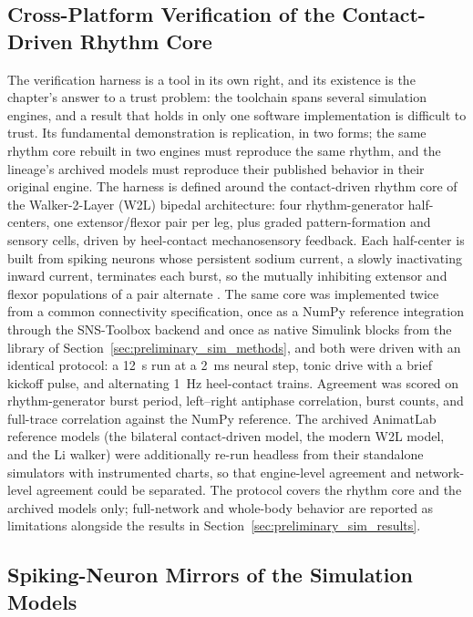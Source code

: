 \subsection{Cross-Platform Verification of the Contact-Driven Rhythm Core}\label{sec:crossengine_methods}

The verification harness is a tool in its own right, and its existence is the chapter's answer to a trust problem: the toolchain spans several simulation engines, and a result that holds in only one software implementation is difficult to trust. Its fundamental demonstration is replication, in two forms; the same rhythm core rebuilt in two engines must reproduce the same rhythm, and the lineage's archived models must reproduce their published behavior in their original engine. The harness is defined around the contact-driven rhythm core of the Walker-2-Layer (W2L) bipedal architecture: four rhythm-generator half-centers, one extensor/flexor pair per leg, plus graded pattern-formation and sensory cells, driven by heel-contact mechanosensory feedback. Each half-center is built from spiking neurons whose persistent sodium current, a slowly inactivating inward current, terminates each burst, so the mutually inhibiting extensor and flexor populations of a pair alternate \citep{deng_neuromechanical_2019}. The same core was implemented twice from a common connectivity specification, once as a NumPy reference integration through the SNS-Toolbox backend and once as native Simulink blocks from the library of Section~\ref{sec:preliminary_sim_methods}, and both were driven with an identical protocol: a \qty{12}{\second} run at a \qty{2}{\milli\second} neural step, tonic drive with a brief kickoff pulse, and alternating \qty{1}{\Hz} heel-contact trains. Agreement was scored on rhythm-generator burst period, left--right antiphase correlation, burst counts, and full-trace correlation against the NumPy reference. The archived AnimatLab reference models (the bilateral contact-driven model, the modern W2L model, and the Li walker) were additionally re-run headless from their standalone simulators with instrumented charts, so that engine-level agreement and network-level agreement could be separated. The protocol covers the rhythm core and the archived models only; full-network and whole-body behavior are reported as limitations alongside the results in Section~\ref{sec:preliminary_sim_results}.

\subsection{Spiking-Neuron Mirrors of the Simulation Models}\label{sec:spiking_methods}

